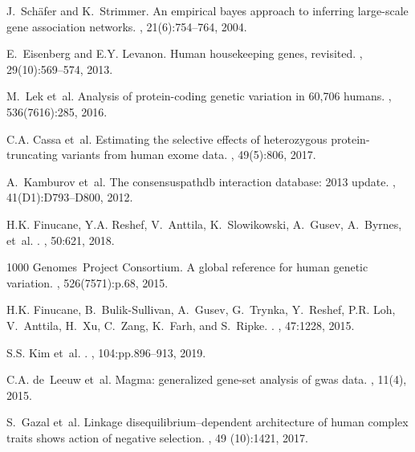 \documentclass{bioinfo}
\begin{document}
\begin{thebibliography}{}
J.~Sch{\"a}fer and K.~Strimmer.
\newblock An empirical bayes approach to inferring large-scale gene association
  networks.
, 21(6):754--764, 2004.

E.~Eisenberg and E.Y. Levanon.
\newblock Human housekeeping genes, revisited.
, 29(10):569--574, 2013.

M.~Lek et~al.
\newblock Analysis of protein-coding genetic variation in 60,706 humans.
, 536(7616):285, 2016.

C.A. Cassa et~al.
\newblock Estimating the selective effects of heterozygous protein-truncating
  variants from human exome data.
, 49(5):806, 2017.

A.~Kamburov et~al.
\newblock The consensuspathdb interaction database: 2013 update.
, 41(D1):D793--D800, 2012.

H.K. Finucane, Y.A. Reshef, V.~Anttila, K.~Slowikowski, A.~Gusev, A.~Byrnes,
  et~al.
.
, 50:621, 2018.

1000 Genomes~Project Consortium.
\newblock A global reference for human genetic variation.
, 526(7571):p.68, 2015.

H.K. Finucane, B.~Bulik-Sullivan, A.~Gusev, G.~Trynka, Y.~Reshef, P.R. Loh,
  V.~Anttila, H.~Xu, C.~Zang, K.~Farh, and S.~Ripke.
.
, 47:1228, 2015.

S.S. Kim et~al.
.
, 104:pp.896--913, 2019.

C.A. de~Leeuw et~al.
\newblock Magma: generalized gene-set analysis of gwas data.
, 11(4), 2015.

S.~Gazal et~al.
\newblock Linkage disequilibrium–dependent architecture of human complex
  traits shows action of negative selection.
, 49 (10):1421, 2017.


\end{thebibliography}
\end{document}
